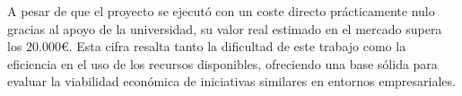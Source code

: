 A pesar de que el proyecto se ejecutó con un coste directo prácticamente nulo gracias al apoyo de la universidad, su valor real estimado en el mercado supera los 20.000€. Esta cifra resalta tanto la dificultad de este trabajo como la eficiencia en el uso de los recursos disponibles, ofreciendo una base sólida para evaluar la viabilidad económica de iniciativas similares en entornos empresariales.



